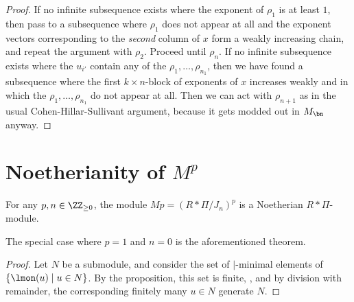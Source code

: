 \documentclass{amsart}
\begin{document}
\begin{proof}
If no infinite subsequence exists where the exponent of $\rho_1$ is at
least $1$, then pass to a subsequence where $\rho_1$ does not appear at
all and the exponent vectors corresponding to the {\em second} column
of $x$ form a weakly increasing chain, and repeat the argument with
$\rho_2$. Proceed until $\rho_n$.  If no infinite subsequence exists
where the $u_{i'}$ contain any of the $\rho_1,\ldots,\rho_{n_1}$, then we
have found a subsequence where the first $k \times n$-block of exponents
of $x$ increases weakly and in which the $\rho_1,\ldots,\rho_{n_1}$
do not appear at all. Then we can act with $\rho_{n+1}$ as in the usual
Cohen-Hillar-Sullivant argument, because it gets modded out in $M_\bn$
anyway.

\end{proof}

\section*{Noetherianity of $M^p$}

\begin{thm}
For any $p,n \in \ZZ_{\geq 0}$, the module $Mp=(R*\Pi/ J_n)^p$ is a
Noetherian $R*\Pi$-module.
\end{thm}

The special case where $p=1$ and $n=0$ is the aforementioned theorem.

\begin{proof}
Let $N$ be a submodule, and consider the set of $|$-minimal elements of
$\{\lmon(u) \mid u \in N\}$. By the proposition, this set is finite, ,
and by division with remainder, the corresponding finitely many $u \in N$
generate $N$.
\end{proof}
\end{document}

